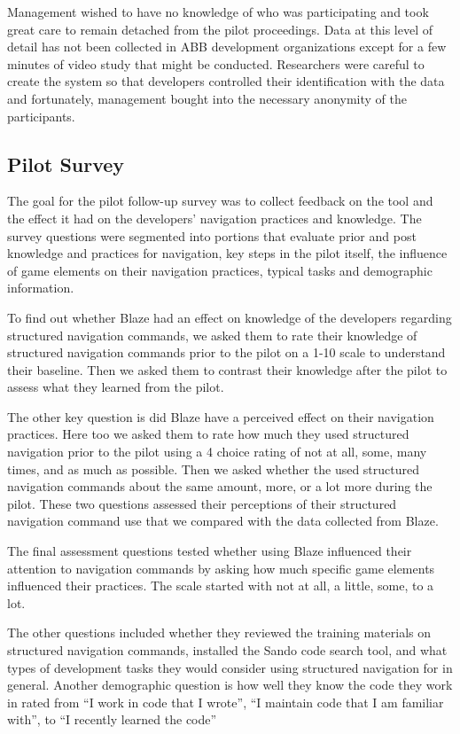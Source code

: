 \documentclass{sig-alternate}
\begin{document}
Management wished to have no knowledge of who was participating and took great care to remain detached from the pilot proceedings.  Data at this level of detail has not been collected in ABB development organizations except for a few minutes of video study that might be conducted.  Researchers were careful to create the system so that developers controlled their identification with the data and fortunately, management bought into the necessary anonymity of the participants.

\subsection{Pilot Survey}

The goal for the pilot follow-up survey was to collect feedback on the tool and the effect it had on the developers' navigation practices and knowledge.  The survey questions were segmented into portions that evaluate prior and post knowledge and practices for navigation, key steps in the pilot itself, the influence of game elements on their navigation practices, typical tasks and demographic information.

To find out whether Blaze had an effect on knowledge of the developers regarding structured navigation commands, we asked them to rate their knowledge of structured navigation commands prior to the pilot on a 1-10 scale to understand their baseline.  Then we asked them to contrast their knowledge after the pilot to assess what they learned from the pilot.

The other key question is did Blaze have a perceived effect on their navigation practices.  Here too we asked them to rate how much they used structured navigation prior to the pilot using a 4 choice rating of not at all, some, many times, and as much as possible.  Then we asked whether the used structured navigation commands about the same amount, more,  or a lot more during the pilot.  These two questions assessed their perceptions of their structured navigation command use that we compared with the data collected from Blaze.

The final assessment questions tested whether using Blaze influenced their attention to navigation commands by asking how much specific game elements influenced their practices.  The scale started with not at all, a little, some, to a lot.  

The other questions included whether they reviewed the training materials on structured navigation commands, installed the Sando code search tool, and what types of development tasks they would consider using structured navigation for in general.  Another demographic question is how well they know the code they work in rated from ``I work in code that I wrote'', ``I maintain code that I am familiar with'', to ``I recently learned the code''
\end{document}
